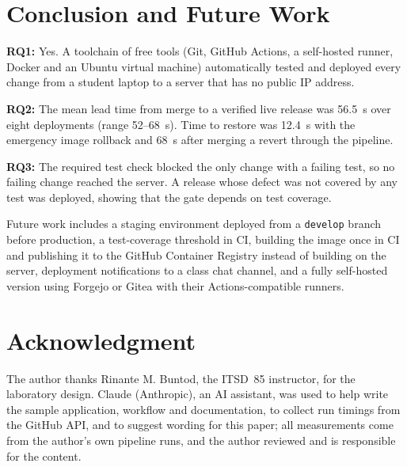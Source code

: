 \documentclass[conference]{IEEEtran}
\begin{document}
\section{Conclusion and Future Work}
\textbf{RQ1:} Yes. A toolchain of free tools (Git, GitHub Actions, a self-hosted runner, Docker and an Ubuntu virtual machine) automatically tested and deployed every change from a student laptop to a server that has no public IP address.

\textbf{RQ2:} The mean lead time from merge to a verified live release was 56.5~s over eight deployments (range 52--68~s). Time to restore was 12.4~s with the emergency image rollback and 68~s after merging a revert through the pipeline.

\textbf{RQ3:} The required test check blocked the only change with a failing test, so no failing change reached the server. A release whose defect was not covered by any test was deployed, showing that the gate depends on test coverage.

Future work includes a staging environment deployed from a \texttt{develop} branch before production, a test-coverage threshold in CI, building the image once in CI and publishing it to the GitHub Container Registry instead of building on the server, deployment notifications to a class chat channel, and a fully self-hosted version using Forgejo or Gitea with their Actions-compatible runners.

\section*{Acknowledgment}
The author thanks Rinante M. Buntod, the ITSD~85 instructor, for the laboratory design. Claude (Anthropic), an AI assistant, was used to help write the sample application, workflow and documentation, to collect run timings from the GitHub API, and to suggest wording for this paper; all measurements come from the author's own pipeline runs, and the author reviewed and is responsible for the content.
\end{document}
